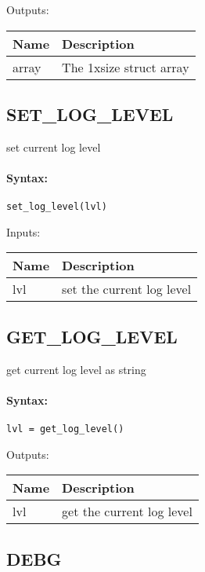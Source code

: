 \bigskip
Outputs:

\begin{tabular}{|p{}|p{}|}
\hline
\textbf{Name} & \textbf{Description} \\
\hline \hline
array & The 1xsize struct array  \\ \hline
\end{tabular}

\subsection{SET\_LOG\_LEVEL}

set current log level

\paragraph{Syntax:} \verb|set_log_level(lvl)|

\bigskip
Inputs:

\begin{tabular}{|p{}|p{}|}
\hline
\textbf{Name} & \textbf{Description} \\
\hline \hline
lvl & set the current log level  \\ \hline
\end{tabular}


\subsection{GET\_LOG\_LEVEL}

get current log level as string

\paragraph{Syntax:} \verb|lvl = get_log_level()|

\bigskip
Outputs:

\begin{tabular}{|p{}|p{}|}
\hline
\textbf{Name} & \textbf{Description} \\
\hline \hline
lvl & get the current log level  \\ \hline
\end{tabular}

\subsection{DEBG}


